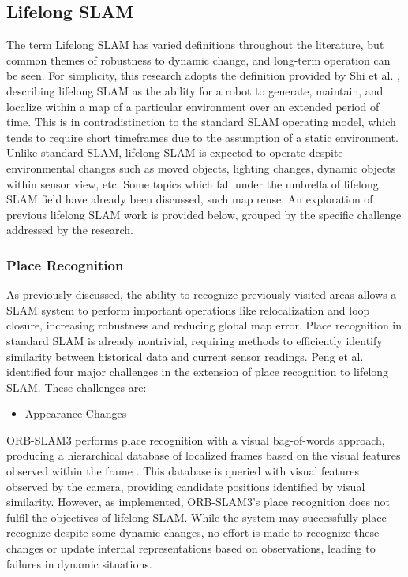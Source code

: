 \subsection{Lifelong SLAM}

The term Lifelong SLAM has varied definitions throughout the literature, but common themes of robustness to dynamic change, and long-term operation can be seen. For simplicity, this research adopts the definition provided by Shi et al. \cite{shiAreWeReady2020}, describing lifelong SLAM as the ability for a robot to generate, maintain, and localize within a map of a particular environment over an extended period of time. This is in contradistinction to the standard SLAM operating model, which tends to require short timeframes due to the assumption of a static environment. Unlike standard SLAM, lifelong SLAM is expected to operate despite environmental changes such as moved objects, lighting changes, dynamic objects within sensor view, etc. Some topics which fall under the umbrella of lifelong SLAM field have already been discussed, such map reuse. An exploration of previous lifelong SLAM work is provided below, grouped by the specific challenge addressed by the research.

\subsubsection{Place Recognition}

As previously discussed, the ability to recognize previously visited areas allows a SLAM system to perform important operations like relocalization and loop closure, increasing robustness and reducing global map error. Place recognition in standard SLAM is already nontrivial, requiring methods to efficiently identify similarity between historical data and current sensor readings. Peng et al. identified four major challenges in the extension of place recognition to lifelong SLAM. These challenges are:
\begin{itemize}
    \item Appearance Changes -
\end{itemize}

ORB-SLAM3 performs place recognition with a visual bag-of-words approach, producing a hierarchical database of localized frames based on the visual features observed within the frame \cite{camposORBSLAM3AccurateOpenSource2021}\cite{galvez-lopezBagsBinaryWords2012}. This database is queried with visual features observed by the camera, providing candidate positions identified by visual similarity. However, as implemented, ORB-SLAM3's place recognition does not fulfil the objectives of lifelong SLAM. While the system may successfully place recognize despite some dynamic changes, no effort is made to recognize these changes or update internal representations based on observations, leading to failures in dynamic situations.



